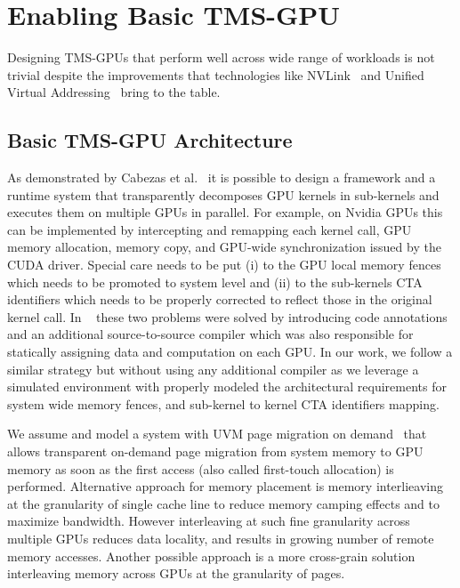 \section{Enabling Basic TMS-GPU}

Designing TMS-GPUs that 
perform well across wide range of workloads is not trivial despite the 
improvements that technologies like NVLink~\cite{NVLINK} and Unified Virtual 
Addressing~\cite{UVM} bring to the table. 



\subsection{Basic TMS-GPU Architecture}
As demonstrated by Cabezas et al.~\cite{Cabezas2015} it is possible 
to design a framework and a runtime system that transparently decomposes GPU 
kernels in sub-kernels and executes them on multiple GPUs in parallel. For
example, on Nvidia GPUs this can be implemented by intercepting and remapping each kernel 
call, GPU memory allocation, memory copy, and GPU-wide synchronization issued 
by the CUDA driver. Special care needs to be put (i) to the GPU local memory 
fences which needs to be promoted to system level and (ii) to the 
sub-kernels CTA identifiers which needs to be properly corrected to 
reflect those in the original kernel call. 
In ~\cite{Cabezas2015} these two problems were solved by introducing  
code annotations and an additional source-to-source compiler which was also 
responsible for statically assigning data and computation on each GPU. In our 
work, we follow a similar strategy but without using any additional 
compiler as we leverage a simulated environment with properly modeled 
the architectural requirements for system wide memory fences,
and sub-kernel to kernel CTA identifiers mapping. 

We assume and model a system with UVM page migration on demand~\cite{P100} that
allows transparent on-demand page migration from system memory to GPU memory as
soon as the first access (also called first-touch allocation) is performed.
Alternative approach for memory placement is memory interlieaving at the
granularity of single cache line to reduce memory camping effects and to
maximize bandwidth. However interleaving at such fine granularity across
multiple GPUs reduces data locality, and results in growing number of remote
memory accesses. Another possible approach is a more cross-grain solution
interleaving memory across GPUs at the granularity of pages. 

